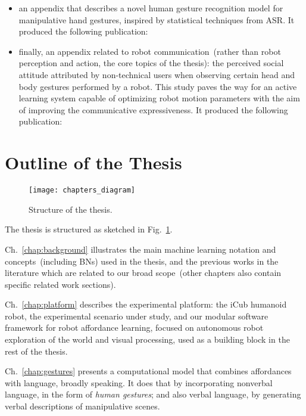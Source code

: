 \begin{itemize}
\item an appendix that describes a novel human gesture recognition model for manipulative hand gestures, inspired by statistical techniques from \ac{ASR}.
It produced the following publication:
\listPublicationsAppendixGestureRecognition

\item finally, an appendix related to robot communication~(rather than robot perception and action, the core topics of the thesis):
the perceived social attitude attributed by non-technical users when observing certain head and body gestures performed by a robot.
This study paves the way for an active learning system capable of optimizing robot motion parameters with the aim of improving the communicative expressiveness.
It produced the following publication:
\listPublicationsAppendixHumanPercRobotGest

\end{itemize}

\section{Outline of the Thesis}
\label{sec:motivation:outline}

\begin{figure}
\centering
\texttt{[image: chapters\_diagram]}
\caption{Structure of the thesis.}
\label{fig:chapters_diagram}
\end{figure}

The thesis is structured as sketched in Fig.~\ref{fig:chapters_diagram}.

Ch.~\ref{chap:background} illustrates
the main machine learning notation and concepts~(including \aclp{BN}) used in the thesis, and
the previous works in the literature which are related to our broad scope~(other chapters also contain specific related work sections).

Ch.~\ref{chap:platform} describes the experimental platform:
the iCub humanoid robot,
the experimental scenario under study, and
our modular software framework for robot affordance learning, focused on autonomous robot exploration of the world and visual processing, used as a building block in the rest of the thesis.

Ch.~\ref{chap:gestures} presents a computational model that combines affordances with language, broadly speaking.
It does that by incorporating
nonverbal language, in the form of \emph{human gestures}; and also
verbal language, by generating verbal descriptions of manipulative scenes.

